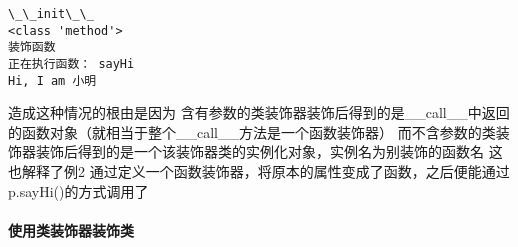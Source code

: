 \documentclass[11pt]{article}
\begin{document}
    \begin{Verbatim}[commandchars=\\\{\}]
\_\_init\_\_
<class 'method'>
装饰函数
正在执行函数： sayHi
Hi, I am 小明

    \end{Verbatim}
造成这种情况的根由是因为 含有参数的类装饰器装饰后得到的是__call__中返回的函数对象（就相当于整个__call__方法是一个函数装饰器）
                       而不含参数的类装饰器装饰后得到的是一个该装饰器类的实例化对象，实例名为别装饰的函数名
                       这也解释了例2 通过定义一个函数装饰器，将原本的属性变成了函数，之后便能通过p.sayHi()的方式调用了
    \hypertarget{ux4f7fux7528ux7c7bux88c5ux9970ux5668ux88c5ux9970ux7c7b}{%
\paragraph{使用类装饰器装饰类}\label{ux4f7fux7528ux7c7bux88c5ux9970ux5668ux88c5ux9970ux7c7b}}
\end{document}
